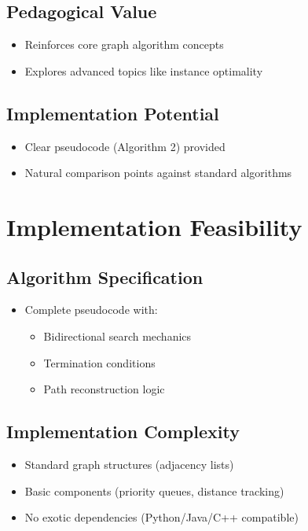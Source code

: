 \documentclass[12pt]{article}
\begin{document}
\subsection{Pedagogical Value}
\begin{itemize}
    \item Reinforces core graph algorithm concepts
    \item Explores advanced topics like instance optimality
\end{itemize}

\subsection{Implementation Potential}
\begin{itemize}
    \item Clear pseudocode (Algorithm 2) provided
    \item Natural comparison points against standard algorithms
\end{itemize}

\section{Implementation Feasibility}
\subsection{Algorithm Specification}
\begin{itemize}
    \item Complete pseudocode with:
    \begin{itemize}
        \item Bidirectional search mechanics
        \item Termination conditions
        \item Path reconstruction logic
    \end{itemize}
\end{itemize}

\subsection{Implementation Complexity}
\begin{itemize}
    \item Standard graph structures (adjacency lists)
    \item Basic components (priority queues, distance tracking)
    \item No exotic dependencies (Python/Java/C++ compatible)
\end{itemize}
\end{document}

